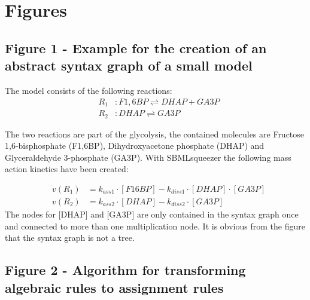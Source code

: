 \documentclass[10pt]{bmc_article}
\newenvironment{bmcformat}{\baselineskip20pt\sloppy\setboolean{publ}{false}}{\baselineskip20pt\sloppy}
\begin{document}
\begin{bmcformat}




\section*{Figures}
 \subsection*{Figure 1 - Example for the creation of an abstract syntax graph of a small model}

The model consists of the following reactions:
\begin{eqnarray*}
&R_{1}&: F1,6BP \rightleftharpoons DHAP + GA3P\\
&R_{2}&: DHAP \rightleftharpoons GA3P
\end{eqnarray*}

The two reactions are part of the glycolysis, the contained molecules are Fructose 1,6-bisphosphate (F1,6BP), Dihydroxyacetone phosphate (DHAP) and Glyceraldehyde 3-phosphate (GA3P). With SBMLsqueezer \cite{Draeger2008} the following mass action kinetics have been created:

\begin{eqnarray*}
&v(R_{1})&=k_{ass1} \cdot [F16BP] - k_{diss1} \cdot[DHAP] \cdot [GA3P]\\
&v(R_{2})&=k_{ass2} \cdot [DHAP] - k_{diss2} \cdot[GA3P]
\end{eqnarray*}
The nodes for [DHAP] and [GA3P] are only contained in the syntax graph once and connected to more than one multiplication node. It is obvious from the figure that the syntax graph is not a tree.

 \subsection*{Figure 2 - Algorithm for transforming algebraic rules to assignment rules}


\end{bmcformat}
\end{document}
